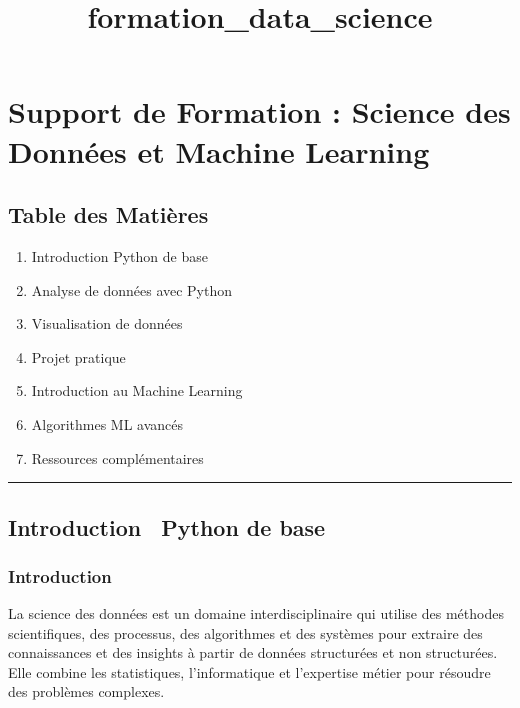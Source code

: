 \documentclass[11pt]{article}
\title{formation\_data\_science}
\begin{document}
    
    \maketitle
    
    

    
\section{Support de Formation : Science des Données et Machine Learning}\label{support-de-formation-science-des-donnuxe9es-et-machine-learning}

\subsection{Table des Matières}\label{table-des-matiuxe8res}

\begin{enumerate}
	\item Introduction Python de base
	\item Analyse de données avec Python
	\item Visualisation de données
	\item Projet pratique
	\item Introduction au Machine Learning
	\item Algorithmes ML avancés
	\item Ressources complémentaires
\end{enumerate}

\begin{center}\rule{0.5\linewidth}{0.5pt}\end{center}

\subsection{Introduction \ Python de
base}\label{introduction-python-de-base}

\subsubsection{Introduction}\label{introduction}

La science des données est un domaine interdisciplinaire qui utilise des
méthodes scientifiques, des processus, des algorithmes et des systèmes
pour extraire des connaissances et des insights à partir de données
structurées et non structurées. Elle combine les statistiques,
l'informatique et l'expertise métier pour résoudre des problèmes
complexes.
\end{document}
